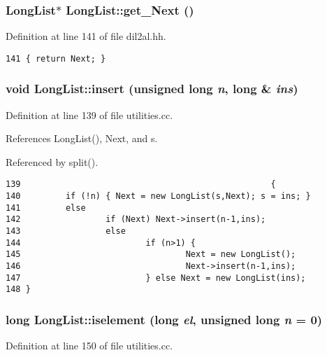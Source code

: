 \subsubsection{\setlength{\rightskip}{0pt plus 5cm}Long\-List$\ast$ Long\-List::get\_\-Next ()\hspace{0.3cm}{\tt  [inline]}}\label{classLongList_a6}




Definition at line 141 of file dil2al.hh.



\footnotesize\begin{verbatim}141 { return Next; }
\end{verbatim}\normalsize 
{}
\subsubsection{\setlength{\rightskip}{0pt plus 5cm}void Long\-List::insert (unsigned long {\em n}, long \& {\em ins})}\label{classLongList_a8}




Definition at line 139 of file utilities.cc.

References Long\-List(), Next, and s.

Referenced by split().



\footnotesize\begin{verbatim}139                                                  {
140         if (!n) { Next = new LongList(s,Next); s = ins; }
141         else
142                 if (Next) Next->insert(n-1,ins);
143                 else 
144                         if (n>1) {
145                                 Next = new LongList();
146                                 Next->insert(n-1,ins);
147                         } else Next = new LongList(ins);
148 }
\end{verbatim}\normalsize 
{}
\subsubsection{\setlength{\rightskip}{0pt plus 5cm}long Long\-List::iselement (long {\em el}, unsigned long {\em n} = 0)}\label{classLongList_a10}




Definition at line 150 of file utilities.cc.


